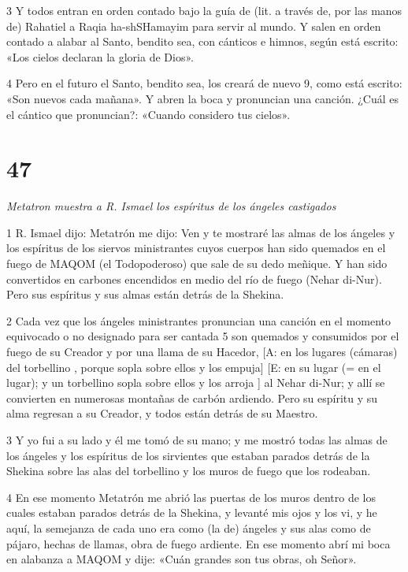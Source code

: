 \par 3 Y todos entran en orden contado bajo la guía de (lit. a través de, por las manos de) Rahatiel a Raqia ha-shSHamayim para servir al mundo. Y salen en orden contado a alabar al Santo, bendito sea, con cánticos e himnos, según está escrito: «Los cielos declaran la gloria de Dios».

\par 4 Pero en el futuro el Santo, bendito sea, los creará de nuevo 9, como está escrito: «Son nuevos cada mañana». Y abren la boca y pronuncian una canción. ¿Cuál es el cántico que pronuncian?: «Cuando considero tus cielos».

\chapter{47}

\par \textit{Metatron muestra a R. Ismael los espíritus de los ángeles castigados}

\par 1 R. Ismael dijo: Metatrón me dijo: Ven y te mostraré las almas de los ángeles y los espíritus de los siervos ministrantes cuyos cuerpos han sido quemados en el fuego de MAQOM (el Todopoderoso) que sale de su dedo meñique. Y han sido convertidos en carbones encendidos en medio del río de fuego (Nehar di-Nur). Pero sus espíritus y sus almas están detrás de la Shekina.

\par 2 Cada vez que los ángeles ministrantes pronuncian una canción en el momento equivocado o no designado para ser cantada 5 son quemados y consumidos por el fuego de su Creador y por una llama de su Hacedor, [A: en los lugares (cámaras) del torbellino , porque sopla sobre ellos y los empuja] [E: en su lugar (= en el lugar); y un torbellino sopla sobre ellos y los arroja ] al Nehar di-Nur; y allí se convierten en numerosas montañas de carbón ardiendo. Pero su espíritu y su alma regresan a su Creador, y todos están detrás de su Maestro.

\par 3 Y yo fui a su lado y él me tomó de su mano; y me mostró todas las almas de los ángeles y los espíritus de los sirvientes que estaban parados detrás de la Shekina sobre las alas del torbellino y los muros de fuego que los rodeaban.

\par 4 En ese momento Metatrón me abrió las puertas de los muros dentro de los cuales estaban parados detrás de la Shekina, y levanté mis ojos y los vi, y he aquí, la semejanza de cada uno era como (la de) ángeles y sus alas como de pájaro, hechas de llamas, obra de fuego ardiente. En ese momento abrí mi boca en alabanza a MAQOM y dije: «Cuán grandes son tus obras, oh Señor».

